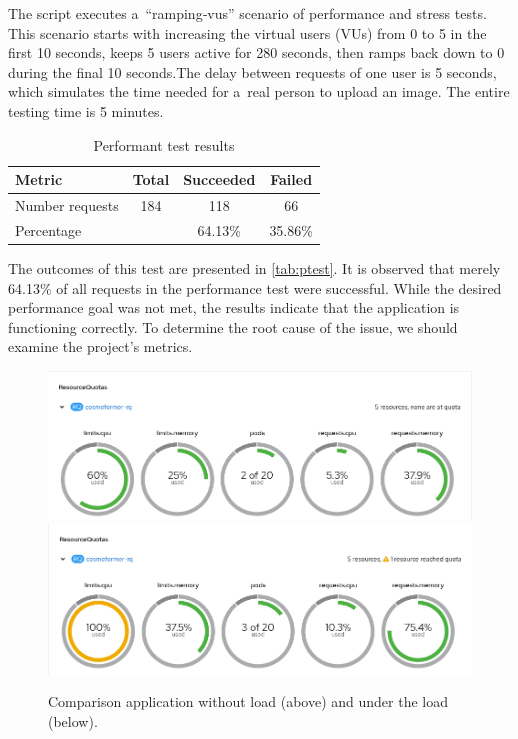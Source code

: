 The script executes a~“ramping‑vus” scenario of performance and stress tests. This scenario starts with increasing the  virtual users (VUs) from 0 to 5 in the first 10 seconds, keeps 5 users active for 280 seconds, then ramps back down to 0 during the final 10 seconds.The delay between requests of one user is 5 seconds, which simulates the time needed for a~real person to upload an image. The entire testing time is 5 minutes. 


\begin{table}[hbtp]
\centering
\caption{Performant test results}
\label{tab:ptest}
\begin{tabular}{|l|c|c|c|}
\hline
Metric          & Total & Succeeded & Failed    \\ \hline
Number requests & 184   & 118       & 66        \\ \hline
Percentage      &       & 64.13\%   & 35.86\%   \\ \hline
\end{tabular}
\end{table}

The outcomes of this test are presented in \autoref{tab:ptest}. It is observed that merely 64.13\% of all requests in the performance test were successful. While the desired performance goal was not met, the results indicate that the application is functioning correctly. To determine the root cause of the issue, we should examine the project's metrics.

\begin{figure}[htbp]\centering
    \centering
    \includegraphics[width=0.8\linewidth]{obrazky-figures/05-implementation/no-load.png}
    \includegraphics[width=0.8\linewidth]{obrazky-figures/05-implementation/load.png}
    \caption{Comparison application without load (above) and under the load (below).}
    \label{fig:test-load}
\end{figure}

